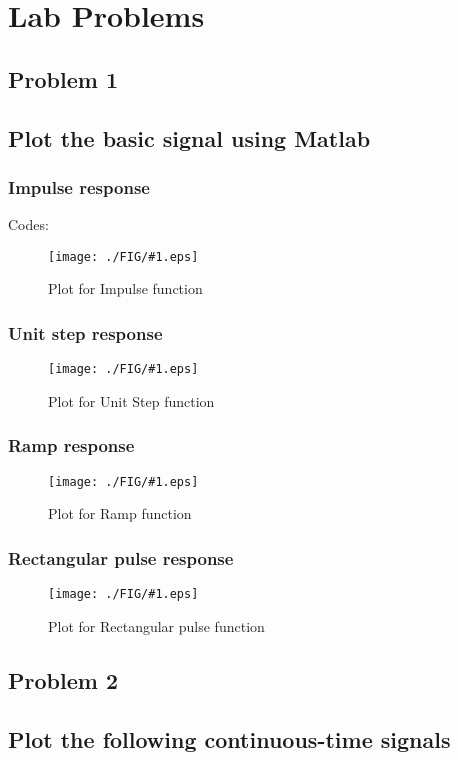 \documentclass[a4paper,11pt]{article}
\newcommand{\mobs}[2]{
    \begin{figure}[H]
        \centering
        \texttt{[image: ./FIG/\#1.eps]}
        \caption{#2}
    \end{figure}
   
}
\begin{document}
\section {Lab Problems}

\subsection{Problem 1}
\subsection*{Plot the basic signal using Matlab}

\subsubsection{Impulse response}
Codes:
\mobs{impulse}{Plot for Impulse function }


\subsubsection{Unit step response}
\mobs{unit}{Plot for Unit Step function }


\subsubsection{Ramp response}
\mobs{ramp}{Plot for Ramp function}


\subsubsection{ Rectangular pulse response}
\mobs{rect}{Plot for Rectangular pulse function}

\subsection{Problem 2}
\subsection*{Plot the following continuous-time signals}
\end{document}
